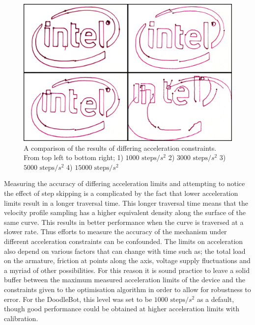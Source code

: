 \begin{figure}[htbp]  
\includegraphics[width=\textwidth]{figures/performance/accelLimits.png}
\caption[Comparison of differing acceleration constraints]{A comparison of the results of differing acceleration constraints. From top left to bottom right; 1) $1000\text{ steps}/s^2$ 2) $3000\text{ steps}/s^2$ 3) $5000\text{ steps}/s^2$ 4) $15000\text{ steps}/s^2$
\label{fig:accelLimits}}
\end{figure}  	

Measuring the accuracy of differing acceleration limits and attempting to notice the effect of step skipping is a complicated by the fact that lower acceleration limits result in a longer traversal time. This longer traversal time means that the velocity profile sampling has a higher equivalent density along the surface of the same curve. This results in better performance when the curve is traversed at a slower rate. Thus efforts to measure the accuracy of the mechanism under different acceleration constraints can be confounded. The limits on acceleration also depend on various factors that can change with time such as; the total load on the armature, friction at points along the axis, voltage supply fluctuations and a myriad of other possibilities.
For this reason it is sound practice to leave a solid buffer between the maximum measured acceleration limits of the device and the constraints given to the optimisation algorithm in order to allow for robustness to error. For the DoodleBot, this level was set to be $1000\text{ steps}/s^2$ as a default, though good performance could be obtained at higher acceleration limits with calibration.
